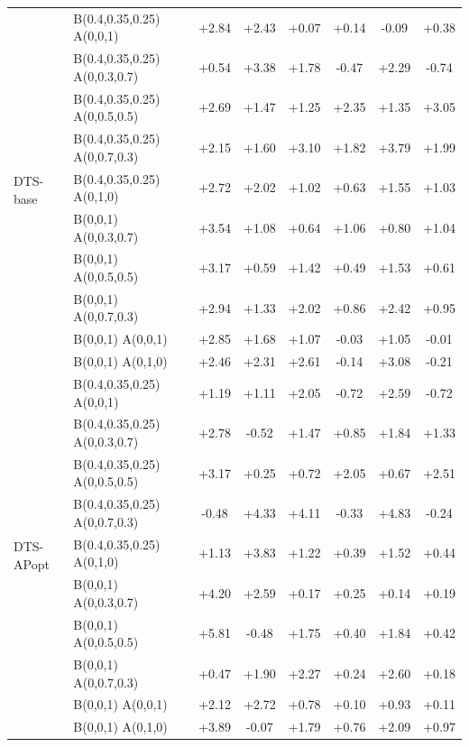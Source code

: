 \documentclass[12pt]{article}
\begin{document}
\begin{table}[h]
\begin{tabular}{llcccccc}
\multirow{10}{*}{DTS-base}
& B(0.4,0.35,0.25) A(0,0,1)     & +2.84 & +2.43 & +0.07 & +0.14 & -0.09 & +0.38 \\
& B(0.4,0.35,0.25) A(0,0.3,0.7) & +0.54 & +3.38 & +1.78 & -0.47 & +2.29 & -0.74 \\
& B(0.4,0.35,0.25) A(0,0.5,0.5) & +2.69 & +1.47 & +1.25 & +2.35 & +1.35 & +3.05 \\
& B(0.4,0.35,0.25) A(0,0.7,0.3) & +2.15 & +1.60 & +3.10 & +1.82 & +3.79 & +1.99 \\
& B(0.4,0.35,0.25) A(0,1,0)     & +2.72 & +2.02 & +1.02 & +0.63 & +1.55 & +1.03 \\
& B(0,0,1) A(0,0.3,0.7)         & +3.54 & +1.08 & +0.64 & +1.06 & +0.80 & +1.04 \\
& B(0,0,1) A(0,0.5,0.5)         & +3.17 & +0.59 & +1.42 & +0.49 & +1.53 & +0.61 \\
& B(0,0,1) A(0,0.7,0.3)         & +2.94 & +1.33 & +2.02 & +0.86 & +2.42 & +0.95 \\
& B(0,0,1) A(0,0,1)             & +2.85 & +1.68 & +1.07 & -0.03 & +1.05 & -0.01 \\
& B(0,0,1) A(0,1,0)             & +2.46 & +2.31 & +2.61 & -0.14 & +3.08 & -0.21 \\

\midrule

\multirow{10}{*}{DTS-APopt}
& B(0.4,0.35,0.25) A(0,0,1)     & +1.19 & +1.11 & +2.05 & -0.72 & +2.59 & -0.72 \\
& B(0.4,0.35,0.25) A(0,0.3,0.7) & +2.78 & -0.52 & +1.47 & +0.85 & +1.84 & +1.33 \\
& B(0.4,0.35,0.25) A(0,0.5,0.5) & +3.17 & +0.25 & +0.72 & +2.05 & +0.67 & +2.51 \\
& B(0.4,0.35,0.25) A(0,0.7,0.3) & -0.48 & +4.33 & +4.11 & -0.33 & +4.83 & -0.24 \\
& B(0.4,0.35,0.25) A(0,1,0)     & +1.13 & +3.83 & +1.22 & +0.39 & +1.52 & +0.44 \\
& B(0,0,1) A(0,0.3,0.7)         & +4.20 & +2.59 & +0.17 & +0.25 & +0.14 & +0.19 \\
& B(0,0,1) A(0,0.5,0.5)         & +5.81 & -0.48 & +1.75 & +0.40 & +1.84 & +0.42 \\
& B(0,0,1) A(0,0.7,0.3)         & +0.47 & +1.90 & +2.27 & +0.24 & +2.60 & +0.18 \\
& B(0,0,1) A(0,0,1)             & +2.12 & +2.72 & +0.78 & +0.10 & +0.93 & +0.11 \\
& B(0,0,1) A(0,1,0)             & +3.89 & -0.07 & +1.79 & +0.76 & +2.09 & +0.97 \\

\bottomrule
\end{tabular}
\end{table}
\end{document}
